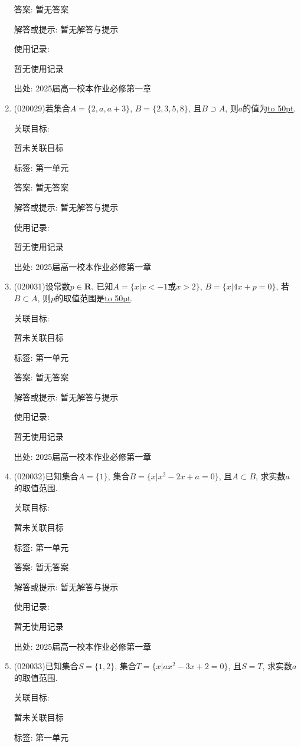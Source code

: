 \documentclass[10pt,a4paper]{article}
\newcommand{\blank}[1]{\underline{\hbox to #1pt{}}}
\begin{document}
\begin{enumerate}[1.]
答案: 暂无答案

解答或提示: 暂无解答与提示

使用记录:

暂无使用记录


出处: 2025届高一校本作业必修第一章
\item { (020029)}若集合$A=\{2,a,a+3\}$, $B=\{2,3,5,8\}$, 且$B\supset A$, 则$a$的值为\blank{50}.


关联目标:

暂未关联目标



标签: 第一单元

答案: 暂无答案

解答或提示: 暂无解答与提示

使用记录:

暂无使用记录


出处: 2025届高一校本作业必修第一章
\item { (020031)}设常数$p\in\mathbf{R}$, 已知$A=\{x|x<-1$或$x>2\}$, $B=\{x|4x+p=0\}$, 若$B\subset A$, 则$p$的取值范围是\blank{50}.


关联目标:

暂未关联目标



标签: 第一单元

答案: 暂无答案

解答或提示: 暂无解答与提示

使用记录:

暂无使用记录


出处: 2025届高一校本作业必修第一章
\item { (020032)}已知集合$A=\{1\}$, 集合$B=\{x|x^2-2x+a=0\}$, 且$A\subset B$, 求实数$a$的取值范围.


关联目标:

暂未关联目标



标签: 第一单元

答案: 暂无答案

解答或提示: 暂无解答与提示

使用记录:

暂无使用记录


出处: 2025届高一校本作业必修第一章
\item { (020033)}已知集合$S=\{1, 2\}$, 集合$T=\{x|ax^2-3x+2=0\}$, 且$S=T$, 求实数$a$的取值范围.


关联目标:

暂未关联目标



标签: 第一单元


\end{enumerate}
\end{document}
